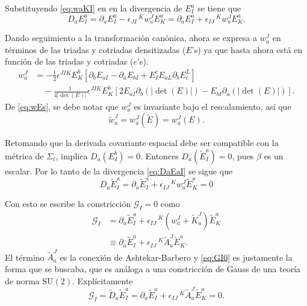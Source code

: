 Substituyendo \eqref{eq:waKI} en en la divergencia de $E^{a}_{I}$ se tiene que
%
\begin{equation}
\label{eq:DaEaI}
D_{a} E^{a}_{I} = \partial_{a} E^{a}_{I} - \epsilon_{JI}\,^{K} w^{J}_{a} E^{a}_{K} = \partial_{a} E^{a}_{I} + \epsilon_{IJ}\,^{K} w^{J}_{a} E^{a}_{K}.
\end{equation}

Dando seguimiento a la transformaci\'{o}n can\'{o}nica, ahora se expresa a $w^{J}_{a}$ en t\'{e}rminos de las triadas y cotriadas densitizadas ($E$'s) ya que hasta ahora est\'{a} en funci\'{o}n de las triadas y cotriadas ($e$'s).
%
\begin{align}
\label{eq:wEs}
w^{J}_{a} & = -\frac{1}{2} \epsilon^{JIK} E^{b}_{K} [\partial_{b} E_{aI} - \partial_{a} E_{bI} + E^{c}_{I} E_{aL} \partial_{b} E^{L}_{c}] \nonumber \\
& \quad - \frac{1}{4 |\det(E)|} \epsilon^{JIK} E^{b}_{K} [2 E_{aI} \partial_{b} (|\det(E)|) - E_{bI} \partial_{a} (|\det(E)|)].
\end{align}
%
De \eqref{eq:wEs}, se debe notar que $w^{J}_{a}$ es invariante bajo el rescalamiento, as\'{i} que
%
\begin{equation}
\tilde{w}^{J}_{a} = w^{J}_{a} (\tilde{E}) = w^{J}_{a} (E).
\end{equation}

Retomando que la derivada covariante espacial debe ser compatible con la m\'{e}trica de $\Sigma_{t}$, implica $D_{a}(E^{b}_{I}) = 0$. Entonces $D_{a}(\tilde{E}^{a}_{I}) = 0$, pues $\beta$ es un escalar. Por lo tanto de la divergencia \eqref{eq:DaEaI} se sigue que
%
\begin{equation}
D_{a} \tilde{E}^{a}_{I} = \partial_{a} \tilde{E}^{a}_{I} + \epsilon_{IJ}\,^{K} w^{J}_{a} \tilde{E}^{a}_{K} = 0
\end{equation}

Con esto se escribe la constricci\'{o}n $\mathcal{G}_{I} = 0$ como
%
\begin{align}
\label{eq:GI0}
\mathcal{G}_{I} & = \partial_{a} \tilde{E}^{a}_{I} + \epsilon_{IJ}\,^{K} (w^{J}_{a} + \tilde{K}^{J}_{a} )\tilde{E}^{a}_{K} \nonumber \\
& \equiv \partial_{a} \tilde{E}^{a}_{I} + \epsilon_{IJ}\,^{K} \tilde{A}^{J}_{a} \tilde{E}^{a}_{K}.
\end{align}
%
El t\'{e}rmino $\tilde{A}^{J}_{a}$ es la conexi\'{o}n de Ashtekar-Barbero y \eqref{eq:GI0} es justamente la forma que se buscaba, que es an\'{a}loga a una constricci\'{o}n de Gauss de una teor\'{i}a de norma $\mathrm{SU}(2)$. Expl\'{i}citamente
%
\begin{equation}
\mathcal{G}_{I} = \tilde{D}_{a} \tilde{E}^{a}_{I} = \partial_{a} \tilde{E}^{a}_{I} + \epsilon_{IJ}\,^{K} \tilde{A}^{J}_{a} \tilde{E}^{a}_{K} = 0.
\end{equation}

